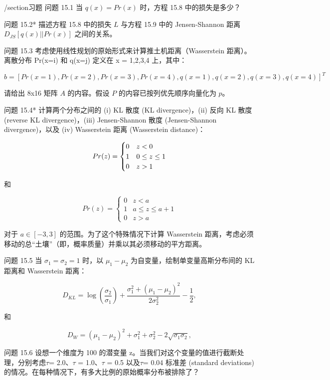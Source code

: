 /section{习题}
问题 15.1 当 \(q(x) = Pr(x)\) 时，方程 15.8 中的损失是多少？

问题 15.2* 描述方程 15.8 中的损失 \(L\) 与方程 15.9 中的 Jensen-Shannon 距离 \(D_{JS}[q(x) || Pr(x)]\) 之间的关系。

问题 15.3 考虑使用线性规划的原始形式来计算推土机距离（Wasserstein 距离）。离散分布 Pr(x=i) 和 q(x=j) 定义在 x = 1,2,3,4 上，其中：

\begin{equation}
b = [Pr(x=1), Pr(x=2), Pr(x=3), Pr(x=4), q(x=1), q(x=2), q(x=3), q(x=4)]^T 
\end{equation}

请给出 8x16 矩阵 \(A\) 的内容。假设 \(P\) 的内容已按列优先顺序向量化为 \(p\)。

问题 15.4* 计算两个分布之间的 (i) KL 散度 (KL divergence)，(ii) 反向 KL 散度 (reverse KL divergence)，(iii) Jensen-Shannon 散度 (Jensen-Shannon divergence)，以及 (iv) Wasserstein 距离 (Wasserstein distance)：

\begin{equation}
Pr(z) = \begin{cases}
0 & z < 0 \\
1 & 0 \leq z \leq 1 \\
0 & z > 1 \notag
\end{cases}
\end{equation}

和

\begin{equation}
Pr(z) = \begin{cases}
0 & z < a \\
1 & a \leq z \leq a + 1 \\
0 & z > a
\end{cases} 
\end{equation}


对于 \(a \in [-3,3]\) 的范围。为了这个特殊情况下计算 Wasserstein 距离，考虑必须移动的总“土壤”（即，概率质量）并乘以其必须移动的平方距离。

问题 15.5 当 \(\sigma_1 = \sigma_2 = 1\) 时，以 \(\mu_1 - \mu_2\) 为自变量，绘制单变量高斯分布间的 KL 距离和 Wasserstein 距离：

\begin{equation}
D_{KL} = \log \left( \frac{\sigma_2}{\sigma_1} \right) + \frac{\sigma_1^2 + (\mu_1 - \mu_2)^2}{2\sigma_2^2} - \frac{1}{2}, 
\end{equation}

和

\begin{equation}
D_{W} = (\mu_1 - \mu_2)^2 + \sigma_1^2 + \sigma_2^2 - 2\sqrt{\sigma_1\sigma_2}, 
\end{equation}

问题 15.6 设想一个维度为 100 的潜变量 z。当我们对这个变量的值进行截断处理，分别考虑\(\tau\)= 2.0、\(\tau\) = 1.0、\(\tau\) = 0.5 以及\(\tau\)= 0.04 标准差 (standard deviations) 的情况。在每种情况下，有多大比例的原始概率分布被排除了？


